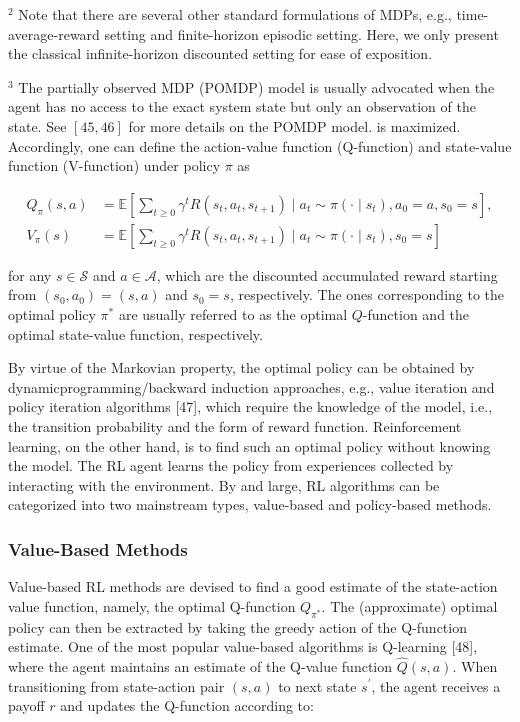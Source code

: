 \documentclass[10pt]{article}
\begin{document}
${ }^{2}$ Note that there are several other standard formulations of MDPs, e.g., time-average-reward setting and finite-horizon episodic setting. Here, we only present the classical infinite-horizon discounted setting for ease of exposition.

${ }^{3}$ The partially observed MDP (POMDP) model is usually advocated when the agent has no access to the exact system state but only an observation of the state. See $[45,46]$ for more details on the POMDP model. is maximized. Accordingly, one can define the action-value function (Q-function) and state-value function (V-function) under policy $\pi$ as

\[
\begin{aligned}
Q_{\pi}(s, a) & =\mathbb{E}\left[\sum_{t \geq 0} \gamma^{t} R\left(s_{t}, a_{t}, s_{t+1}\right) \mid a_{t} \sim \pi\left(\cdot \mid s_{t}\right), a_{0}=a, s_{0}=s\right], \\
V_{\pi}(s) & =\mathbb{E}\left[\sum_{t \geq 0} \gamma^{t} R\left(s_{t}, a_{t}, s_{t+1}\right) \mid a_{t} \sim \pi\left(\cdot \mid s_{t}\right), s_{0}=s\right]
\end{aligned}
\]

for any $s \in \mathcal{S}$ and $a \in \mathcal{A}$, which are the discounted accumulated reward starting from $\left(s_{0}, a_{0}\right)=(s, a)$ and $s_{0}=s$, respectively. The ones corresponding to the optimal policy $\pi^{*}$ are usually referred to as the optimal $Q$-function and the optimal state-value function, respectively.

By virtue of the Markovian property, the optimal policy can be obtained by dynamicprogramming/backward induction approaches, e.g., value iteration and policy iteration algorithms [47], which require the knowledge of the model, i.e., the transition probability and the form of reward function. Reinforcement learning, on the other hand, is to find such an optimal policy without knowing the model. The RL agent learns the policy from experiences collected by interacting with the environment. By and large, RL algorithms can be categorized into two mainstream types, value-based and policy-based methods.

\subsubsection{Value-Based Methods}
Value-based RL methods are devised to find a good estimate of the state-action value function, namely, the optimal Q-function $Q_{\pi^{*}}$. The (approximate) optimal policy can then be extracted by taking the greedy action of the Q-function estimate. One of the most popular value-based algorithms is Q-learning [48], where the agent maintains an estimate of the Q-value function $\hat{Q}(s, a)$. When transitioning from state-action pair $(s, a)$ to next state $s^{\prime}$, the agent receives a payoff $r$ and updates the Q-function according to:
\end{document}

